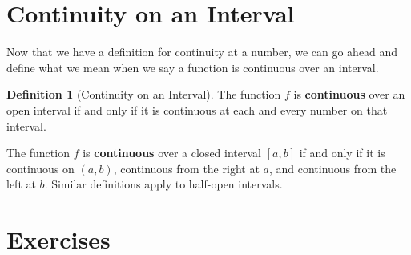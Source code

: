 \documentclass[12pt,]{book}
\newcommand{\terminology}[1]{\textbf{#1}}
\theoremstyle{plain}
\theoremstyle{definition}
\newtheorem{definition}[theorem]{Definition}
\numberwithin{equation}{section}
\newcommand{\cinterval}[2]{\left[#1,#2\right]}
\newcommand{\ointerval}[2]{\left(#1,#2\right)}
\begin{document}
\section[Continuity on an Interval]{Continuity on an Interval}\label{section-continuity-on-an-interval}
Now that we have a definition for continuity at a number, we can go ahead and define what we mean when we say a function is continuous over an interval.%
\begin{definition}[Continuity on an Interval]\label{definition-continuity-on-an-interval}
The function \(f\) is \terminology{continuous} over an open interval if and only if it is continuous at each and every number on that interval.%
\par
The function \(f\) is \terminology{continuous} over a closed interval \(\cinterval{a}{b}\) if and only if it is continuous on \(\ointerval{a}{b}\), continuous from the right at \(a\), and continuous from the left at \(b\). Similar definitions apply to half-open intervals.%
\end{definition}
\typeout{************************************************}
\typeout{************************************************}
\section*{Exercises}\label{exercises-15}
\end{document}
